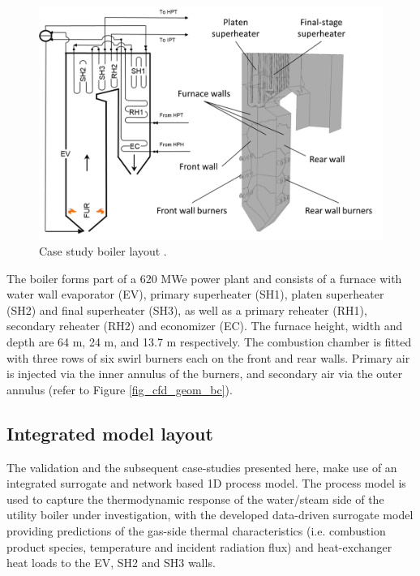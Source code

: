 \documentclass[a4paper,fleqn]{cas-sc}
\begin{document}
\begin{figure}[h!]
	\centering
		\includegraphics[scale=0.5]{CASE_STUDY_BOILER}
	  \caption{Case study boiler layout \citep{Rousseau2020}.}\label{fig_case_layout}
\end{figure}

The boiler forms part of a 620 MWe power plant and consists of a furnace with water wall evaporator (EV), primary superheater (SH1), platen superheater (SH2) and final superheater (SH3), as well as a primary reheater (RH1), secondary reheater (RH2) and economizer (EC).  The furnace height, width and depth are 64 m, 24 m, and 13.7 m respectively.  The combustion chamber is fitted with three rows of six swirl burners each on the front and rear walls.  Primary air is injected via the inner annulus of the burners, and secondary air via the outer annulus (refer to Figure \ref{fig_cfd_geom_bc}).

\subsection{Integrated model layout}

The validation and the subsequent case-studies presented here, make use of an integrated surrogate and network based 1D process model. The process model is used to capture the thermodynamic response of the water/steam side of the utility boiler under investigation, with the developed data-driven surrogate model providing predictions of the gas-side thermal characteristics (i.e. combustion product species, temperature and incident radiation flux) and heat-exchanger heat loads to the EV, SH2 and SH3 walls.\\
\end{document}
